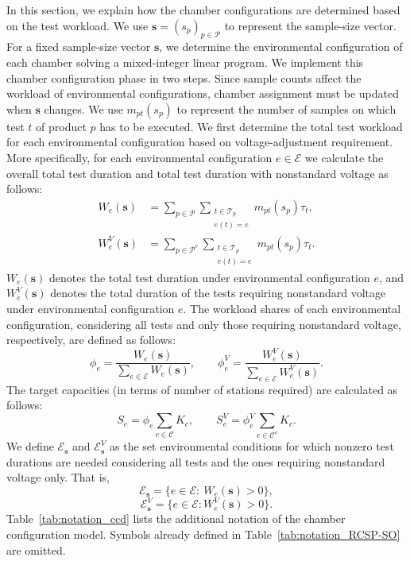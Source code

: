 \documentclass[11pt]{article}
\begin{document}
In this section, we explain how the chamber configurations are determined based on the test workload. We use \(\mathbf{s}=(s_p)_{p\in\mathcal{P}}\) to represent the sample-size vector. For a fixed sample-size vector \(\mathbf{s}\), we determine the environmental configuration of each chamber solving a mixed-integer linear program. We implement this chamber configuration phase in two steps. Since sample counts affect the workload of environmental configurations, chamber assignment must be updated when \(\mathbf{s}\) changes. We use \(m_{pt}(s_p)\) to represent the number of samples on which test \(t\) of product \(p\) has to be executed. We first determine the total test workload for each environmental configuration based on voltage-adjustment requirement. More specifically, for each environmental configuration \(e \in \mathcal{E}\) we calculate the overall total test duration and total test duration with nonstandard voltage as follows:
\begin{align*}
W_e(\mathbf{s}) &=
\sum_{p\in\mathcal{P}}
\sum_{\substack{t\in\mathcal{T}_p\\e(t)=e}}
m_{pt}(s_p)\tau_t,
\\
W_e^V(\mathbf{s}) &=
\sum_{p\in\mathcal{P}^v}
\sum_{\substack{t\in\mathcal{T}_p\\e(t)=e}}
m_{pt}(s_p)\tau_t.
\end{align*}
\(W_e(\mathbf{s})\) denotes the total test duration under environmental configuration \(e\), and \(W_e^V(\mathbf{s})\) denotes the total duration of the tests requiring nonstandard voltage under environmental configuration \(e\). The workload shares of each environmental configuration, considering all tests and only those requiring nonstandard voltage, respectively, are defined as follows:
\[
\phi_e=\frac{W_e(\mathbf{s})}{\sum\limits_{e\in\mathcal{E}}W_e(\mathbf{s})},\qquad
\phi_e^V=\frac{W_e^V(\mathbf{s})}{\sum\limits_{e\in\mathcal{E}}W_e^V(\mathbf{s})}.
\]
The target capacities (in terms of number of stations required) are calculated as follows:
\[
S_e=\phi_e \sum_{c\in\mathcal{C}}K_c,\qquad
S_e^V=\phi_e^V \sum_{c\in\mathcal{C}^v}K_c.
\]
We define \(\mathcal{E}_\mathbf{s}\) and \(\mathcal{E}^V_\mathbf{s}\) as the set environmental conditions for which nonzero test durations are needed considering all tests and the ones requiring nonstandard voltage only. That is,
\[
\mathcal{E}_\mathbf{s}=\{e\in\mathcal{E}:\ W_e(\mathbf{s})>0\},
\]
\[
\mathcal{E}^V_\mathbf{s}=\{e\in\mathcal{E}:W_e^V(\mathbf{s})>0\}.
\]
Table~\ref{tab:notation_ccd} lists the additional notation of the chamber configuration model. Symbols already defined in Table~\ref{tab:notation_RCSP-SO} are omitted.
\end{document}
